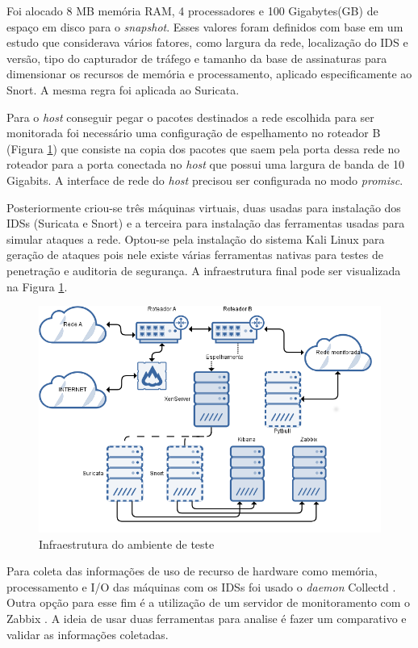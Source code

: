 \documentclass[
	12pt,				
	openright,		
	twoside,	
	a4paper,
	english,	
	brazil	
	]{abntex2}
\begin{document}
Foi alocado 8 MB memória RAM, 4 processadores e 100 Gigabytes(GB) de espaço em disco para o \textit{snapshot}. Esses valores foram definidos com base em um estudo \cite{mikelococo} que considerava vários fatores, como largura da rede, localização do IDS e versão, tipo do capturador de tráfego e tamanho da base de assinaturas para dimensionar os recursos de memória e processamento, aplicado especificamente ao Snort. A mesma regra foi aplicada ao Suricata.

Para o \textit{host} conseguir pegar o pacotes destinados a rede escolhida para ser monitorada foi necessário uma configuração de espelhamento no roteador B (Figura \ref{fig:infra-ambiente}) que consiste na copia dos pacotes que saem pela porta dessa rede no roteador para a porta conectada no \textit{host} que possui uma largura de banda de 10 Gigabits. A interface de rede do \textit{host} precisou ser configurada no modo \textit{promisc}.

Posteriormente criou-se três máquinas virtuais, duas usadas para instalação dos IDSs (Suricata e Snort) e a terceira para instalação das ferramentas usadas para simular ataques a rede. Optou-se pela instalação do sistema Kali Linux \cite{kalilinux} para geração de ataques pois nele existe várias ferramentas nativas para testes de penetração e auditoria de segurança. A infraestrutura final pode ser visualizada na Figura \ref{fig:infra-ambiente}.

\begin{figure}[!htp]
 \centering
 \includegraphics[scale=.5]{infra.png}
 \caption{Infraestrutura do ambiente de teste}
 \label{fig:infra-ambiente}
\end{figure}

Para coleta das informações de uso de recurso de hardware como memória, processamento e I/O das máquinas com os IDSs foi usado o \textit{daemon} Collectd \cite{collectd}. Outra opção para esse fim é a utilização de um servidor de monitoramento com o Zabbix \cite{zabbix}. A ideia de usar duas ferramentas para analise é fazer um comparativo e validar as informações coletadas.
\end{document}
